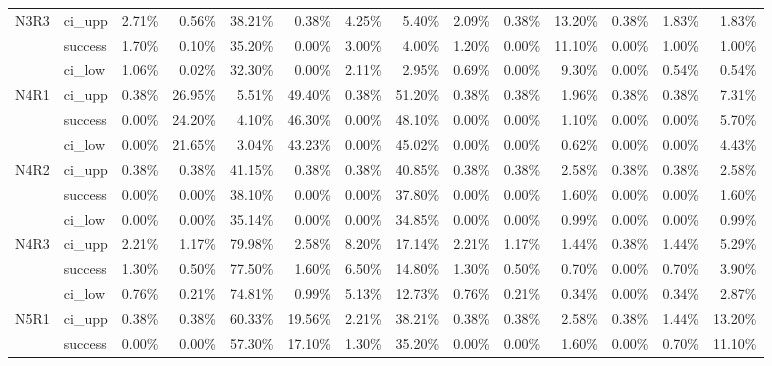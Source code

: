 \begin{tabular}{llrrrrrrrrrrrr}
N3R3 & ci\_upp &       2.71\% &  0.56\% & 38.21\% &  0.38\% &  4.25\% &  5.40\% &        2.09\% & 0.38\% & 13.20\% & 0.38\% & 1.83\% &  1.83\% \\
     & success &       1.70\% &  0.10\% & 35.20\% &  0.00\% &  3.00\% &  4.00\% &        1.20\% & 0.00\% & 11.10\% & 0.00\% & 1.00\% &  1.00\% \\
     & ci\_low &       1.06\% &  0.02\% & 32.30\% &  0.00\% &  2.11\% &  2.95\% &        0.69\% & 0.00\% &  9.30\% & 0.00\% & 0.54\% &  0.54\% \\
N4R1 & ci\_upp &       0.38\% & 26.95\% &  5.51\% & 49.40\% &  0.38\% & 51.20\% &        0.38\% & 0.38\% &  1.96\% & 0.38\% & 0.38\% &  7.31\% \\
     & success &       0.00\% & 24.20\% &  4.10\% & 46.30\% &  0.00\% & 48.10\% &        0.00\% & 0.00\% &  1.10\% & 0.00\% & 0.00\% &  5.70\% \\
     & ci\_low &       0.00\% & 21.65\% &  3.04\% & 43.23\% &  0.00\% & 45.02\% &        0.00\% & 0.00\% &  0.62\% & 0.00\% & 0.00\% &  4.43\% \\
N4R2 & ci\_upp &       0.38\% &  0.38\% & 41.15\% &  0.38\% &  0.38\% & 40.85\% &        0.38\% & 0.38\% &  2.58\% & 0.38\% & 0.38\% &  2.58\% \\
     & success &       0.00\% &  0.00\% & 38.10\% &  0.00\% &  0.00\% & 37.80\% &        0.00\% & 0.00\% &  1.60\% & 0.00\% & 0.00\% &  1.60\% \\
     & ci\_low &       0.00\% &  0.00\% & 35.14\% &  0.00\% &  0.00\% & 34.85\% &        0.00\% & 0.00\% &  0.99\% & 0.00\% & 0.00\% &  0.99\% \\
N4R3 & ci\_upp &       2.21\% &  1.17\% & 79.98\% &  2.58\% &  8.20\% & 17.14\% &        2.21\% & 1.17\% &  1.44\% & 0.38\% & 1.44\% &  5.29\% \\
     & success &       1.30\% &  0.50\% & 77.50\% &  1.60\% &  6.50\% & 14.80\% &        1.30\% & 0.50\% &  0.70\% & 0.00\% & 0.70\% &  3.90\% \\
     & ci\_low &       0.76\% &  0.21\% & 74.81\% &  0.99\% &  5.13\% & 12.73\% &        0.76\% & 0.21\% &  0.34\% & 0.00\% & 0.34\% &  2.87\% \\
N5R1 & ci\_upp &       0.38\% &  0.38\% & 60.33\% & 19.56\% &  2.21\% & 38.21\% &        0.38\% & 0.38\% &  2.58\% & 0.38\% & 1.44\% & 13.20\% \\
     & success &       0.00\% &  0.00\% & 57.30\% & 17.10\% &  1.30\% & 35.20\% &        0.00\% & 0.00\% &  1.60\% & 0.00\% & 0.70\% & 11.10\% \\

\end{tabular}

